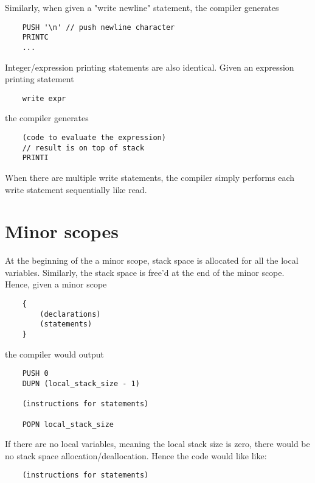 \documentclass{article}
\begin{document}
\noindent
Similarly, when given a "write newline" statement, the compiler generates
\begin{lstlisting}
    PUSH '\n' // push newline character
    PRINTC
    ...
\end{lstlisting}

\noindent
Integer/expression printing statements are also identical.
\newline
Given an expression printing statement
\begin{lstlisting}
    write expr
\end{lstlisting}
the compiler generates
\begin{lstlisting}
    (code to evaluate the expression)
    // result is on top of stack
    PRINTI
\end{lstlisting}

\noindent
When there are multiple write statements, the compiler simply performs each write statement sequentially like read.

\newpage
\section{Minor scopes}

At the beginning of the a minor scope, stack space is allocated for all the local variables. Similarly, the stack space is free'd at the end of the minor scope.
\newline
\newline
Hence, given a minor scope
\begin{lstlisting}
    {
        (declarations)
        (statements)
    }
\end{lstlisting}
the compiler would output
\begin{lstlisting}
    PUSH 0
    DUPN (local_stack_size - 1)
    
    (instructions for statements)
    
    POPN local_stack_size
\end{lstlisting}

\noindent
If there are no local variables, meaning the local stack size is zero, there would be no stack space allocation/deallocation. Hence the code would like like:
\begin{lstlisting}
    (instructions for statements)
\end{lstlisting}
\end{document}
